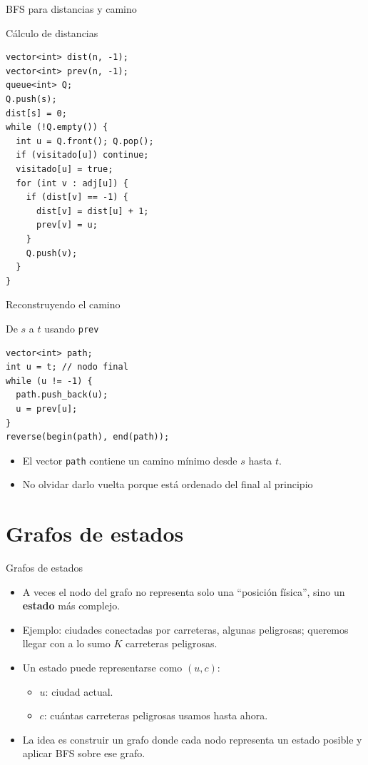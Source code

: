 \documentclass[aspectratio=169]{beamer}
\begin{document}
\begin{frame}[fragile]{BFS para distancias y camino}
  \begin{block}{Cálculo de distancias}
  \begin{lstlisting}[style=customc]
vector<int> dist(n, -1);
vector<int> prev(n, -1);
queue<int> Q;
Q.push(s);
dist[s] = 0;
while (!Q.empty()) {
  int u = Q.front(); Q.pop();
  if (visitado[u]) continue;
  visitado[u] = true;
  for (int v : adj[u]) {
    if (dist[v] == -1) {
      dist[v] = dist[u] + 1;
      prev[v] = u;
    }
    Q.push(v);
  }
}\end{lstlisting}
  \end{block}
\end{frame}

\begin{frame}[fragile]{Reconstruyendo el camino}
  \begin{block}{De \(s\) a \(t\) usando \texttt{prev}}
  \begin{lstlisting}[style=customc]
vector<int> path;
int u = t; // nodo final
while (u != -1) {
  path.push_back(u);
  u = prev[u];
}
reverse(begin(path), end(path));
  \end{lstlisting}
  \end{block}
  \begin{itemize}
    \item El vector \texttt{path} contiene un camino mínimo desde \(s\) hasta \(t\).
    \item No olvidar darlo vuelta porque está ordenado del final al principio
  \end{itemize}
\end{frame}

\section{Grafos de estados}

\begin{frame}{Grafos de estados}
  \begin{itemize}
    \item A veces el nodo del grafo no representa solo una ``posición física'', sino un \textbf{estado} más complejo.
    \item Ejemplo: ciudades conectadas por carreteras, algunas peligrosas; queremos llegar con a lo sumo \(K\) carreteras peligrosas.
    \item Un estado puede representarse como \((u, c)\):
      \begin{itemize}
        \item \(u\): ciudad actual.
        \item \(c\): cuántas carreteras peligrosas usamos hasta ahora.
      \end{itemize}
    \item La idea es construir un grafo donde cada nodo representa un estado posible y aplicar BFS sobre ese grafo.
  \end{itemize}
\end{frame}
\end{document}
